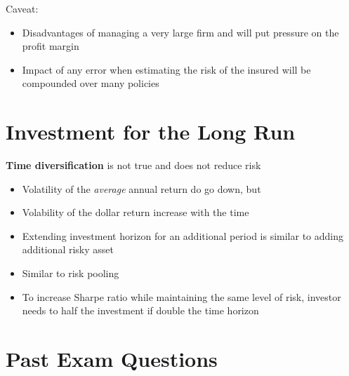\documentclass[]{book}
\theoremstyle{definition}
\theoremstyle{definition}
\theoremstyle{remark}
\begin{document}
Caveat:

\begin{itemize}
\item
  Disadvantages of managing a very large firm and will put pressure on
  the profit margin
\item
  Impact of any error when estimating the risk of the insured will be
  compounded over many policies
\end{itemize}

\section{Investment for the Long Run}\label{investment-for-the-long-run}

\textbf{Time diversification} is not true and does not reduce risk

\begin{itemize}
\item
  Volatility of the \emph{average} annual return do go down, but
\item
  Volability of the dollar return increase with the time
\item
  Extending investment horizon for an additional period is similar to
  adding additional risky asset
\item
  Similar to risk pooling
\item
  To increase Sharpe ratio while maintaining the same level of risk,
  investor needs to half the investment if double the time horizon
\end{itemize}

\section{Past Exam Questions}\label{past-exam-questions-1}
\end{document}
